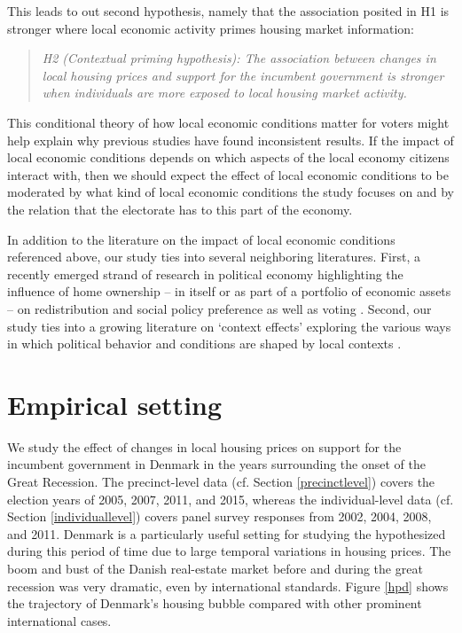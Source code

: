 \documentclass[12pt,a4paper]{article}
\begin{document}
	This leads to out second hypothesis, namely that the association posited in H1 is stronger where local economic activity primes housing market information:
	
	\newcommand{\htwo}{the contextual priming hypothesis}
	
	\begin{quote}
	\textit{H2 (Contextual priming hypothesis): The association between changes in local housing prices and support for the incumbent government is stronger when individuals are more exposed to local housing market activity.}
	\end{quote}
	
	This conditional theory of how local economic conditions matter for voters might help explain why previous studies have found inconsistent results. If the impact of local economic conditions depends on which aspects of the local economy citizens interact with, then we should expect the effect of local economic conditions to be moderated by what kind of local economic conditions the study focuses on and by the relation that the electorate has to this part of the economy.
	
	In addition to the literature on the impact of local economic conditions referenced above, our study ties into several neighboring literatures. First, a recently emerged strand of research in political economy highlighting the influence of home ownership -- in itself or as part of a portfolio of economic assets -- on redistribution and social policy preference as well as voting \citep{ansell2014political,nadeau2010patrimonial,stubager2013reaching}. Second, our study ties into a growing literature on `context effects' exploring the various ways in which political behavior and conditions are shaped by local contexts \citep[e.g.,][]{hopkins2010politicized}.
	
	\section{Empirical setting}
	
	We study the effect of changes in local housing prices on support for the incumbent government in Denmark in the years surrounding the onset of the Great Recession. The precinct-level data (cf. Section \ref{precinctlevel}) covers the election years of 2005, 2007, 2011, and 2015, whereas the individual-level data (cf. Section \ref{individuallevel}) covers panel survey responses from 2002, 2004, 2008, and 2011. Denmark is a particularly useful setting for studying the hypothesized during this period of time due to large temporal variations in housing prices. The boom and bust of the Danish real-estate market before and during the great recession was very dramatic, even by international standards. Figure \ref{hpd} shows the trajectory of Denmark's housing bubble compared with other prominent international cases.
	
\end{document}
